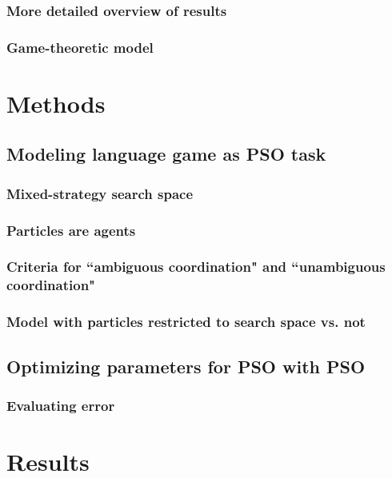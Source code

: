 \documentclass[12pt]{article}
\begin{document}
\subsubsection{More detailed overview of results}
\subsubsection{Game-theoretic model}


\section{Methods}
\subsection{Modeling language game as PSO task}
\subsubsection{Mixed-strategy search space}
\subsubsection{Particles are agents}
\subsubsection{Criteria for ``ambiguous coordination" and ``unambiguous coordination"}
\subsubsection{Model with particles restricted to search space vs. not}

\subsection{Optimizing parameters for PSO with PSO}
\subsubsection{Evaluating error}

\section{Results}
\end{document}

